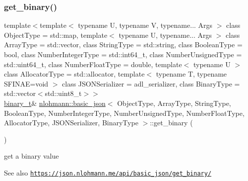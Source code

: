 \subsubsection{\texorpdfstring{get\+\_\+binary()}{get\_binary()}\hspace{0.1cm}{\footnotesize\ttfamily [1/2]}}
{\footnotesize\ttfamily template$<$template$<$ typename U, typename V, typename... Args $>$ class Object\+Type = std\+::map, template$<$ typename U, typename... Args $>$ class Array\+Type = std\+::vector, class String\+Type  = std\+::string, class Boolean\+Type  = bool, class Number\+Integer\+Type  = std\+::int64\+\_\+t, class Number\+Unsigned\+Type  = std\+::uint64\+\_\+t, class Number\+Float\+Type  = double, template$<$ typename U $>$ class Allocator\+Type = std\+::allocator, template$<$ typename T, typename S\+F\+I\+N\+A\+E=void $>$ class J\+S\+O\+N\+Serializer = adl\+\_\+serializer, class Binary\+Type  = std\+::vector$<$std\+::uint8\+\_\+t$>$$>$ \\
\hyperlink{classnlohmann_1_1basic__json_ad6c955145bebde84d93991ffed7cd389}{binary\+\_\+t}\& \hyperlink{classnlohmann_1_1basic__json}{nlohmann\+::basic\+\_\+json}$<$ Object\+Type, Array\+Type, String\+Type, Boolean\+Type, Number\+Integer\+Type, Number\+Unsigned\+Type, Number\+Float\+Type, Allocator\+Type, J\+S\+O\+N\+Serializer, Binary\+Type $>$\+::get\+\_\+binary (\begin{DoxyParamCaption}{ }\end{DoxyParamCaption})\hspace{0.3cm}{\ttfamily [inline]}}



get a binary value 

\begin{DoxySeeAlso}{See also}
\href{https://json.nlohmann.me/api/basic_json/get_binary/}{\tt https\+://json.\+nlohmann.\+me/api/basic\+\_\+json/get\+\_\+binary/} 
\end{DoxySeeAlso}
\mbox{\label{classnlohmann_1_1basic__json_abbfa5532931abd2d9040cbf4d18a2ca7}} 
